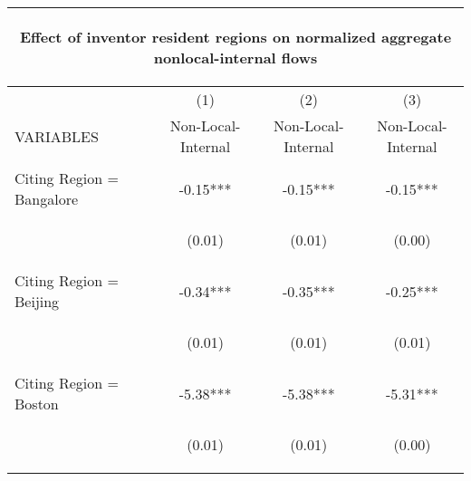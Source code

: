 \begin{center}
\begin{tabular}{lccc}
\multicolumn{4}{c}{\begin{large}Effect of inventor resident regions on normalized aggregate nonlocal-internal flows \label{nonlocalinternal}\end{large}} \\ \hline
 & (1) & (2) & (3) \\
VARIABLES & Non-Local-Internal & Non-Local-Internal & Non-Local-Internal \\ \hline
\vspace{4pt} & \begin{footnotesize}\end{footnotesize} & \begin{footnotesize}\end{footnotesize} & \begin{footnotesize}\end{footnotesize} \\
Citing Region = Bangalore & -0.15*** & -0.15*** & -0.15*** \\
\vspace{4pt} & \begin{footnotesize}(0.01)\end{footnotesize} & \begin{footnotesize}(0.01)\end{footnotesize} & \begin{footnotesize}(0.00)\end{footnotesize} \\
Citing Region = Beijing & -0.34*** & -0.35*** & -0.25*** \\
\vspace{4pt} & \begin{footnotesize}(0.01)\end{footnotesize} & \begin{footnotesize}(0.01)\end{footnotesize} & \begin{footnotesize}(0.01)\end{footnotesize} \\
Citing Region = Boston & -5.38*** & -5.38*** & -5.31*** \\
\vspace{4pt} & \begin{footnotesize}(0.01)\end{footnotesize} & \begin{footnotesize}(0.01)\end{footnotesize} & \begin{footnotesize}(0.00)\end{footnotesize} \\

\end{tabular}
\end{center}
